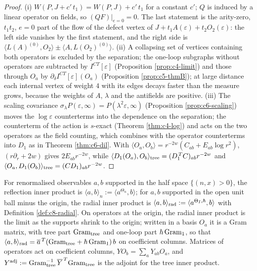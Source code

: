 \begin{proof}
(i) $W(P,J+c'\,t_1)=W(P,J)+c'\,t_1$ for a constant $c'$; $Q$ is induced by a linear operator on fields, so $(QF)|_{e=0}=0$. The last statement is the arity-zero, $t_1t_2$, $e=0$ part of the flow of the defect vertex of $J+t_1A(\varepsilon)+t_2O_2(\varepsilon)$: the left side vanishes by the first statement, and the right side is $\langle L(A)^{(0)},O_2\rangle\pm\langle A,L(O_2)^{(0)}\rangle$. (ii) A collapsing set of vertices containing both operators is excluded by the separation; the one-loop subgraphs without operators are subtracted by $I^{CT}[\varepsilon]$ (Proposition \ref{prop:c4-limit}) and those through $O_a$ by $\partial_\delta I^{CT}[\varepsilon](O_a)$ (Proposition \ref{prop:c5-thmB}); at large distance each internal vertex of weight $4$ with its edges decays faster than the measure grows, because the weights of $A$, $\lambda$ and the antifields are positive. (iii) The scaling covariance $\sigma_\lambda P(\varepsilon,\infty)=P(\lambda^2\varepsilon,\infty)$ (Proposition \ref{prop:c6-scaling}) moves the $\log\varepsilon$ counterterms into the dependence on the separation; the counterterm of the action is $s$-exact (Theorem \ref{thm:c4-log}) and acts on the two operators as the field counting, which combines with the operator counterterms into $D_1$ as in Theorem \ref{thm:c6-dil}. With $\langle O_a,O_b\rangle=r^{-2w}(C_{ab}+E_{ab}\log r^2)$, $(r\partial_r+2w)$ gives $2E_{ab}r^{-2w}$, while $\langle D_1(O_a),O_b\rangle_{\rm tree}=(D_1^{\,T}C)_{ab}r^{-2w}$ and $\langle O_a,D_1(O_b)\rangle_{\rm tree}=(CD_1)_{ab}r^{-2w}$.
\end{proof}

\begin{definition}
\label{def:c8-inner}
For renormalised observables $a,b$ supported in the half space $\{(n,x)>0\}$, the reflection inner product is $\langle a,b\rangle_n:=\langle a^{\Theta_n},b\rangle$; for $a,b$ supported in the open unit ball minus the origin, the radial inner product is $\langle a,b\rangle_{\rm rad}:=\langle a^{\Theta_I,\hbar},b\rangle$ with Definition \ref{def:c8-radial}. On operators at the origin, the radial inner product is the limit as the supports shrink to the origin; written in a basis $O_a$ it is a Gram matrix, with tree part $\mathrm{Gram}_{\rm tree}$ and one-loop part $\hbar\,\mathrm{Gram}_{\rm 1}$, so that $\langle a,b\rangle_{\rm rad}=\overline a^{\,T}(\mathrm{Gram}_{\rm tree}+\hbar\,\mathrm{Gram}_{\rm 1})\,b$ on coefficient columns. Matrices of operators act on coefficient columns, $YO_b=\sum_aY_{ab}O_a$, and $Y^{\rm adj}:=\mathrm{Gram}_{\rm tree}^{-1}\,\overline{Y}^{\,T}\mathrm{Gram}_{\rm tree}$ is the adjoint for the tree inner product.
\end{definition}

